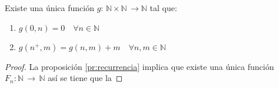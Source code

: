     \begin{proposition} Existe una única función $g: \, \mathbb{N} \times
        \mathbb{N} \, \rightarrow \mathbb{N}$ tal que:
        \begin{enumerate}
            \item $g(0,n) = 0\quad \forall n \in \mathbb{N}$
            \item $g(n^+,m) = g(n,m)+m \quad \forall n,m \in \mathbb{N}$
        \end{enumerate}
    \end{proposition}
    \begin{proof}
        La proposición \ref{pr:recurrencia} implica que existe una única función
        $F_n: \mathbb{N} \, \rightarrow \, \mathbb{N}$ así se tiene que la 
    \end{proof}

